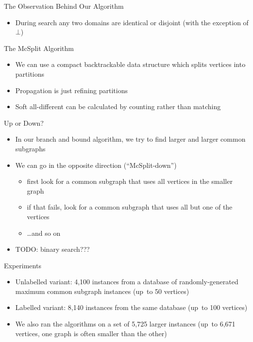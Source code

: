 \documentclass{beamer}
\begin{document}
\begin{frame}{The Observation Behind Our Algorithm}

    \begin{itemize}
        \item During search any two domains are identical or
            disjoint (with the exception of $\bot$)
    \end{itemize}

\end{frame}

\begin{frame}{The McSplit Algorithm}
    \begin{itemize}
        \item We can use a compact backtrackable data structure which splits vertices into
            partitions
        \item Propagation is just refining partitions
        \item Soft all-different can be calculated by counting rather than matching
    \end{itemize}
\end{frame}

\begin{frame}{Up or Down?}
    \begin{itemize}
        \item In our branch and bound algorithm, we try to find larger and larger common subgraphs
        \item We can go in the opposite direction (``McSplit-down'')
          \begin{itemize}
            \item first look for a common subgraph that uses all vertices in the smaller graph
            \item if that fails, look for a common subgraph that uses all but one of the vertices
            \item \dots and so on
          \end{itemize}
        \item TODO: binary search???
    \end{itemize}
\end{frame}

\begin{frame}{Experiments}

    \begin{itemize}
        \item Unlabelled variant: 4,100 instances from a
          database of randomly-generated maximum common subgraph instances (up~to 50 vertices)
        \item Labelled variant: 8,140 instances from the same database (up~to 100 vertices)
        \item We also ran the algorithms on a set of 5,725 larger instances (up~to 6,671 vertices,
            one graph is often smaller than the other)
    \end{itemize}

\end{frame}
\end{document}
